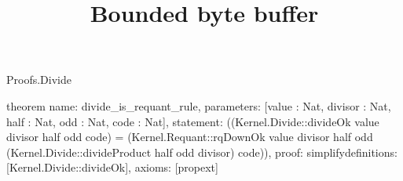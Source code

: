 \begin{lexlean}{Proofs.Divide}
\title{Bounded byte buffer}
\begin{semanticmodule}
theorem{
  name: divide_is_requant_rule,
  parameters: [value : Nat, divisor : Nat, half : Nat, odd : Nat, code : Nat],
  statement: ((Kernel.Divide::divideOk value divisor half odd code) = (Kernel.Requant::rqDownOk value divisor half odd (Kernel.Divide::divideProduct half odd divisor) code)),
  proof: simplify{definitions: [Kernel.Divide::divideOk]},
  axioms: [propext]
}
\end{semanticmodule}
\end{lexlean}
